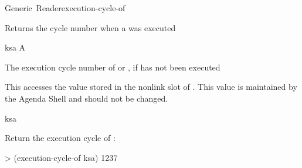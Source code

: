 \documentclass[10pt,twoside,english,pdftex]{article}
\begin{document}
\begin{functiondoc}{Generic~Reader}{execution-cycle-of}{ 
    \returns{} }
%
%

\fnsyntax

\fnpurpose Returns the cycle number when a  was executed

\fnmethods
{}

\fnpackage {}

\fnmodule {}

\fnargs
\begin{args}{ksa}
\arg[ksa] A 
\end{args}

\fnreturns The execution cycle number of  or \nil, if  has
not been executed
  
\fndescription 
This  accesses the value stored in the 
 nonlink slot of . This value is
maintained by the Agenda Shell and should not be changed.

\begin{alsos}{ksa}
\also[ksa]
\end{alsos}

\fnexample
Return the execution cycle of :
\begin{example}
> (execution-cycle-of ksa)
1237
\end{example}

\end{functiondoc}

 
\end{document}
